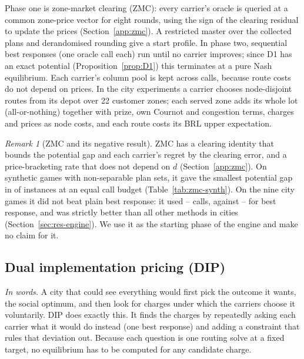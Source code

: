 \documentclass[preprint,11pt]{elsarticle}
\theoremstyle{definition}
\theoremstyle{remark}
\newtheorem{remark}[theorem]{Remark}
\begin{document}
Phase one is zone-market clearing (ZMC): every carrier's oracle is queried at a common zone-price vector for eight rounds, using the sign of the clearing residual to update the prices (Section~\ref{app:zmc}). A restricted master over the collected plans and derandomised rounding give a start profile. In phase two, sequential best responses (one oracle call each) run until no carrier improves; since D1 has an exact potential (Proposition~\ref{prop:D1}) this terminates at a pure Nash equilibrium. Each carrier's column pool is kept across calls, because route costs do not depend on prices. In the city experiments a carrier chooses node-disjoint routes from its depot over 22 customer zones; each served zone adds its whole lot (all-or-nothing) together with prize, own Cournot and congestion terms, charges and prices as node costs, and each route costs its BRL upper expectation.

\begin{remark}[ZMC and its negative result]\label{rem:zmc}
ZMC has a clearing identity that bounds the potential gap and each carrier's regret by the clearing error, and a price-bracketing rate that does not depend on $d$ (Section~\ref{app:zmc}). On synthetic games with non-separable plan sets, it gave the smallest potential gap in \ZMCsynthWins{} of \ZMCsynthN{} instances at an equal call budget (Table~\ref{tab:zmc-synth}). On the nine city games it did not beat plain best response: it used \EfiveCallsZMCmin--\EfiveCallsZMCmax{} calls, against \EfiveCallsBRmin--\EfiveCallsBRmax{} for best response, and was strictly better than all other methods in \EfiveZMCstrictBestN{} cities (Section~\ref{sec:res-engine}). We use it as the starting phase of the engine and make no claim for it.
\end{remark}


\subsection{Dual implementation pricing (DIP)}\label{sec:dip}

\emph{In words.} A city that could see everything would first pick the outcome it wants, the social optimum, and then look for charges under which the carriers choose it voluntarily. DIP does exactly this. It finds the charges by repeatedly asking each carrier what it would do instead (one best response) and adding a constraint that rules that deviation out. Because each question is one routing solve at a fixed target, no equilibrium has to be computed for any candidate charge.
\end{document}
